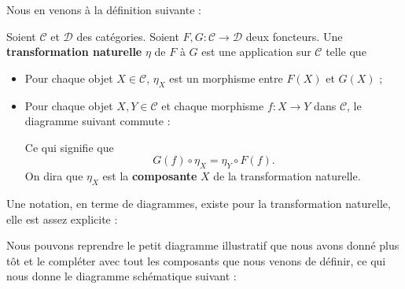 \documentclass{article}
\begin{document}
\noindent
Nous en venons à la définition suivante :\\

\begin{definition}{}
    Soient $\mathcal C$ et $\mathcal D$ des catégories. Soient $F, G:\mathcal C\to\mathcal D$ deux foncteurs. Une \textbf{transformation naturelle} $\eta$ de $F$ à $G$ est une application sur $\mathcal C$ telle que
    \begin{itemize}[label=\textbullet]
        \item Pour chaque objet $X\in\mathcal C$, $\eta_X$ est un morphisme entre $F(X)$ et $G(X)$ ;
        \item Pour chaque objet $X, Y\in\mathcal C$ et chaque morphisme $f:X\to Y$ dans $\mathcal C$, le diagramme suivant commute :
        \begin{center}
        \end{center}
        Ce qui signifie que $$G(f)\circ\eta_X=\eta_Y\circ F(f).$$ On dira que $\eta_X$ est la \textbf{composante} $X$ de la transformation naturelle.
    \end{itemize}
\end{definition}

\noindent
Une notation, en terme de diagrammes, existe pour la transformation naturelle, elle est assez explicite :

\begin{center}
\end{center}

Nous pouvons reprendre le petit diagramme illustratif que nous avons donné plus tôt et le compléter avec tout les composants que nous venons de définir, ce qui nous donne le diagramme schématique suivant :
\end{document}
